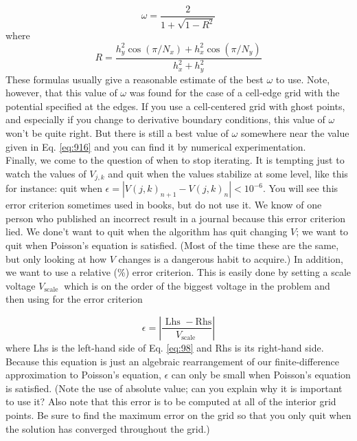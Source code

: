 \begin{equation}\label{eq:916}
\omega=\frac{2}{1+\sqrt{1-R^{2}}}
\end{equation}
where
\begin{equation}\label{eq:917}
R=\frac{h_{y}^{2} \cos \left(\pi / N_{x}\right)+h_{x}^{2} \cos \left(\pi / N_{y}\right)}{h_{x}^{2}+h_{y}^{2}}
\end{equation}
These formulas usually give a reasonable estimate of the best $\omega$ to use. Note,
however, that this value of $\omega$ was found for the case of a cell-edge grid with the
potential specified at the edges. If you use a cell-centered grid with ghost points,
and especially if you change to derivative boundary conditions, this value of $\omega$
won\rq t be quite right. But there is still a best value of $\omega$ somewhere near the value
given in Eq. \eqref{eq:916} and you can find it by numerical experimentation. \\ 
Finally, we come to the question of when to stop iterating. It is tempting just to watch the values of $V_{j, k}$ and quit when the values stabilize at some level, like this for instance: quit when $\epsilon=\left|V(j, k)_{n+1}-V(j, k)_{n}\right|<10^{-6}$. You will see this error criterion sometimes used in books, but do not use it. We know of one person who published an incorrect result in a journal because this error criterion lied. We done\rq t want to quit when the algorithm has quit changing $V$; we want to quit when Poisson\rq s equation is satisfied. (Most of the time these are the same, but only looking at how $V$ changes is a dangerous habit to acquire.) In addition, we want to use a relative (\%) error criterion. This is easily done by setting a scale voltage $V_{\text {scale }}$ which is on the order of the biggest voltage in the problem and then using for the error criterion

\begin{equation}\label{eq:918}
\epsilon=\left|\frac{\text { Lhs }-\mathrm{Rhs}}{V_{\text {scale }}}\right|
\end{equation}
where Lhs is the left-hand side of Eq. \eqref{eq:98} and Rhs is its right-hand side. Because this equation is just an algebraic rearrangement of our finite-difference approximation to Poisson\rq s equation, $\epsilon$ can only be small when Poisson\rq s equation is satisfied. (Note the use of absolute value; can you explain why it is important to use it? Also note that this error is to be computed at all of the interior grid points. Be sure to find the maximum error on the grid so that you only quit when the solution has converged throughout the grid.)\\

